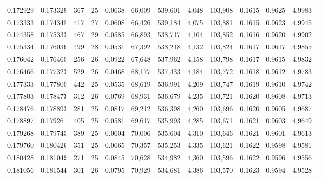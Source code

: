 \begin{tabular}{rrrrrrrrrrrrr}
0.172929 & 0.173329 &   367 &  25 &                                     0.0638 &  66,009 & 539,601 &   4,048 & 103,908 & 0.1615 & 0.9625 & 4.9983 \\
0.173333 & 0.174348 &   417 &  27 &                                     0.0608 &  66,426 & 539,184 &   4,075 & 103,881 & 0.1615 & 0.9623 & 4.9945 \\
0.174358 & 0.175333 &   467 &  29 &                                     0.0585 &  66,893 & 538,717 &   4,104 & 103,852 & 0.1616 & 0.9620 & 4.9902 \\
0.175334 & 0.176036 &   499 &  28 &                                     0.0531 &  67,392 & 538,218 &   4,132 & 103,824 & 0.1617 & 0.9617 & 4.9855 \\
0.176042 & 0.176460 &   256 &  26 &                                     0.0922 &  67,648 & 537,962 &   4,158 & 103,798 & 0.1617 & 0.9615 & 4.9832 \\
0.176466 & 0.177323 &   529 &  26 &                                     0.0468 &  68,177 & 537,433 &   4,184 & 103,772 & 0.1618 & 0.9612 & 4.9783 \\
0.177333 & 0.177800 &   442 &  25 &                                     0.0535 &  68,619 & 536,991 &   4,209 & 103,747 & 0.1619 & 0.9610 & 4.9742 \\
0.177803 & 0.178473 &   312 &  26 &                                     0.0769 &  68,931 & 536,679 &   4,235 & 103,721 & 0.1620 & 0.9608 & 4.9713 \\
0.178476 & 0.178893 &   281 &  25 &                                     0.0817 &  69,212 & 536,398 &   4,260 & 103,696 & 0.1620 & 0.9605 & 4.9687 \\
0.178897 & 0.179261 &   405 &  25 &                                     0.0581 &  69,617 & 535,993 &   4,285 & 103,671 & 0.1621 & 0.9603 & 4.9649 \\
0.179268 & 0.179745 &   389 &  25 &                                     0.0604 &  70,006 & 535,604 &   4,310 & 103,646 & 0.1621 & 0.9601 & 4.9613 \\
0.179760 & 0.180426 &   351 &  25 &                                     0.0665 &  70,357 & 535,253 &   4,335 & 103,621 & 0.1622 & 0.9598 & 4.9581 \\
0.180428 & 0.181049 &   271 &  25 &                                     0.0845 &  70,628 & 534,982 &   4,360 & 103,596 & 0.1622 & 0.9596 & 4.9556 \\
0.181056 & 0.181544 &   301 &  26 &                                     0.0795 &  70,929 & 534,681 &   4,386 & 103,570 & 0.1623 & 0.9594 & 4.9528 \\

\end{tabular}
